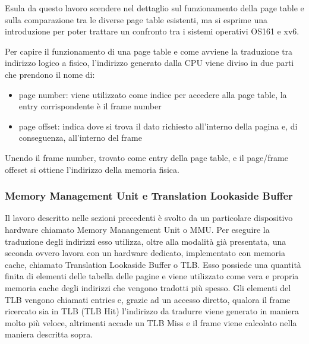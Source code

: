 Esula da questo lavoro scendere nel dettaglio sul funzionamento della page table e sulla comparazione tra le diverse page table esistenti, ma si esprime una introduzione per poter trattare un confronto tra i sistemi operativi OS161 e xv6.

Per capire il funzionamento di una page table e come avviene la traduzione tra indirizzo logico a fisico, l'indirizzo generato dalla CPU viene diviso in due parti che prendono il nome di:
\begin{itemize}
    \item page number: viene utilizzato come indice per accedere alla page table, la entry corrispondente è il frame number
    \item page offset: indica dove si trova il dato richiesto all'interno della pagina e, di conseguenza, all'interno del frame
\end{itemize}
Unendo il frame number, trovato come entry della page table, e il page/frame offeset si ottiene l'indirizzo della memoria fisica.

\subsubsection{Memory Management Unit e Translation Lookaside Buffer}
Il lavoro descritto nelle sezioni precedenti è svolto da un particolare dispositivo hardware chiamato Memory Manangement Unit o MMU. Per eseguire la traduzione degli indirizzi esso utilizza, oltre alla modalità già presentata, una seconda ovvero lavora con un hardware dedicato, implementato con memoria cache, chiamato Translation Lookaside Buffer o TLB. Esso possiede una quantità finita di elementi delle tabella delle pagine e viene utilizzato come vera e propria memoria cache degli indirizzi che vengono tradotti più spesso. Gli elementi del TLB vengono chiamati entries e, grazie ad un accesso diretto, qualora il frame ricercato sia in TLB (TLB Hit) l'indirizzo da tradurre viene generato in maniera molto più veloce, altrimenti accade un TLB Miss e il frame viene calcolato nella maniera descritta sopra.

